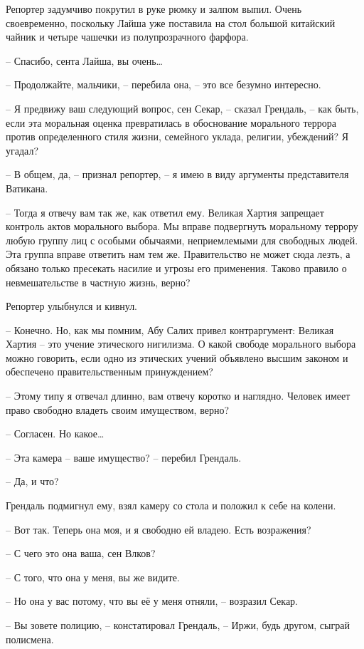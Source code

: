 Репортер задумчиво покрутил в руке рюмку и залпом выпил. Очень своевременно, поскольку Лайша уже поставила на стол большой китайский чайник и четыре чашечки из полупрозрачного фарфора.

-- Спасибо, сента Лайша, вы очень\ldots{}

-- Продолжайте, мальчики, -- перебила она, -- это все безумно интересно.

-- Я предвижу ваш следующий вопрос, сен Секар, -- сказал Грендаль, -- как быть, если эта моральная оценка превратилась в обоснование морального террора против определенного стиля жизни, семейного уклада, религии, убеждений? Я угадал?

-- В общем, да, -- признал репортер, -- я имею в виду аргументы представителя Ватикана.

-- Тогда я отвечу вам так же, как ответил ему. Великая Хартия запрещает контроль актов морального выбора. Мы вправе подвергнуть моральному террору любую группу лиц с особыми обычаями, неприемлемыми для свободных людей. Эта группа вправе ответить нам тем же. Правительство не может сюда лезть, а обязано только пресекать насилие и угрозы его применения. Таково правило о невмешательстве в частную жизнь, верно?

Репортер улыбнулся и кивнул.

-- Конечно. Но, как мы помним, Абу Салих привел контраргумент: Великая Хартия -- это учение этического нигилизма. О какой свободе морального выбора можно говорить, если одно из этических учений объявлено высшим законом и обеспечено правительственным принуждением?

-- Этому типу я отвечал длинно, вам отвечу коротко и наглядно. Человек имеет право свободно владеть своим имуществом, верно?

-- Согласен. Но какое\ldots{}

-- Эта камера -- ваше имущество? -- перебил Грендаль.

-- Да, и что?

Грендаль подмигнул ему, взял камеру со стола и положил к себе на колени.

-- Вот так. Теперь она моя, и я свободно ей владею. Есть возражения?

-- С чего это она ваша, сен Влков?

-- С того, что она у меня, вы же видите.

-- Но она у вас потому, что вы её у меня отняли, -- возразил Секар.

-- Вы зовете полицию, -- констатировал Грендаль, -- Иржи, будь другом, сыграй полисмена.


